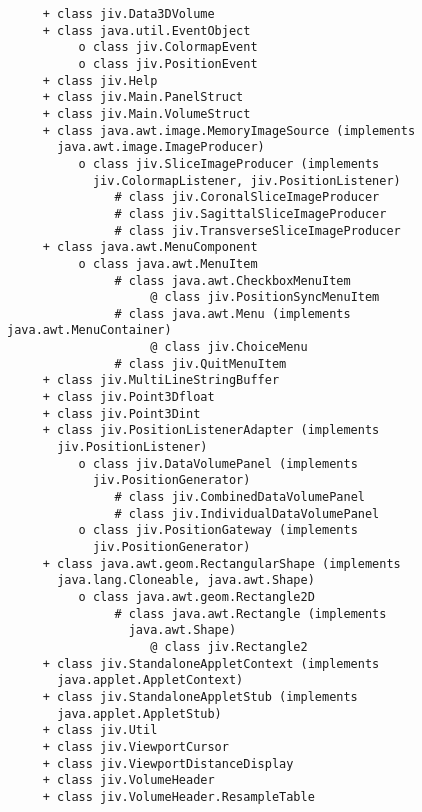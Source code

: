 \begin{verbatim}
     + class jiv.Data3DVolume
     + class java.util.EventObject
          o class jiv.ColormapEvent
          o class jiv.PositionEvent
     + class jiv.Help
     + class jiv.Main.PanelStruct
     + class jiv.Main.VolumeStruct
     + class java.awt.image.MemoryImageSource (implements
       java.awt.image.ImageProducer)
          o class jiv.SliceImageProducer (implements
            jiv.ColormapListener, jiv.PositionListener)
               # class jiv.CoronalSliceImageProducer
               # class jiv.SagittalSliceImageProducer
               # class jiv.TransverseSliceImageProducer
     + class java.awt.MenuComponent
          o class java.awt.MenuItem
               # class java.awt.CheckboxMenuItem
                    @ class jiv.PositionSyncMenuItem
               # class java.awt.Menu (implements java.awt.MenuContainer)
                    @ class jiv.ChoiceMenu
               # class jiv.QuitMenuItem
     + class jiv.MultiLineStringBuffer
     + class jiv.Point3Dfloat
     + class jiv.Point3Dint
     + class jiv.PositionListenerAdapter (implements
       jiv.PositionListener)
          o class jiv.DataVolumePanel (implements
            jiv.PositionGenerator)
               # class jiv.CombinedDataVolumePanel
               # class jiv.IndividualDataVolumePanel
          o class jiv.PositionGateway (implements
            jiv.PositionGenerator)
     + class java.awt.geom.RectangularShape (implements
       java.lang.Cloneable, java.awt.Shape)
          o class java.awt.geom.Rectangle2D
               # class java.awt.Rectangle (implements
                 java.awt.Shape)
                    @ class jiv.Rectangle2
     + class jiv.StandaloneAppletContext (implements
       java.applet.AppletContext)
     + class jiv.StandaloneAppletStub (implements
       java.applet.AppletStub)
     + class jiv.Util
     + class jiv.ViewportCursor
     + class jiv.ViewportDistanceDisplay
     + class jiv.VolumeHeader
     + class jiv.VolumeHeader.ResampleTable
\end{verbatim}
\normalsize
